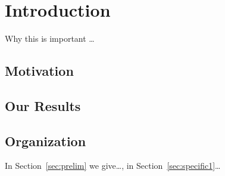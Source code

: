 \documentclass[../techreport.tex]{subfiles}
\begin{document}
\section{Introduction}
\label{sec:intro}
Why this is important \ldots 
\subsection{Motivation}
\subsection{Our Results}

\subsection{Organization}
In Section~\ref{sec:prelim} we give\ldots, in Section~\ref{sec:specific1}\ldots

\end{document}
